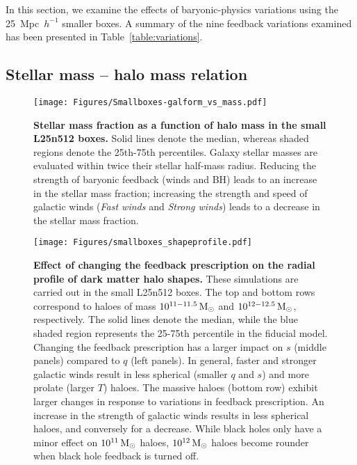 \documentclass[fleqn,usenatbib]{mnras}
\def\msun{\,\rm M_{\odot}}
\begin{document}
In this section, we examine the effects of baryonic-physics variations using the 25~Mpc~$h^{-1}$ smaller boxes. A summary of the nine feedback variations examined has been presented in Table~\ref{table:variations}.



\subsection{Stellar mass -- halo mass relation}

\begin{figure}
	\centering
	\texttt{[image: Figures/Smallboxes-galform\_vs\_mass.pdf]}
	\caption{{\bf Stellar mass fraction as a function of halo mass in the small L25n512 boxes.}
	Solid lines denote the median, whereas shaded regions denote the 25th-75th percentiles. Galaxy stellar masses are evaluated within twice their stellar half-mass radius. 
	Reducing the strength of baryonic feedback (winds and BH) leads to an increase in the stellar mass fraction; increasing the strength and speed of galactic winds (\emph{Fast winds} and \emph{Strong winds}) leads to a decrease in the stellar mass fraction.
	}
	\label{fig:smallboxes_galform}
\end{figure}

\begin{figure*}
    \centering
    \texttt{[image: Figures/smallboxes\_shapeprofile.pdf]}
    \caption{{\bf Effect of changing the feedback prescription on the radial profile of dark matter halo shapes.}
    These simulations are carried out in the small L25n512 boxes.
    The top and bottom rows correspond to haloes of mass $10^{11-11.5} \msun $ and $10^{12-12.5} \msun$, respectively. 
    The solid lines denote the median, while the blue shaded region represents the 25-75th percentile in the fiducial model.
    Changing the feedback prescription has a larger impact on $s$ (middle panels) compared to $q$ (left panels).
    In general, faster and stronger galactic winds result in less spherical (smaller $q$ and $s$) and more prolate (larger $T$) haloes.
    The massive haloes (bottom row) exhibit larger changes in response to variations in feedback prescription.
	An increase in the strength of galactic winds results in less spherical haloes, and conversely for a decrease.
	While black holes only have a minor effect on $10^{11} \msun$ haloes, $10^{12} \msun$ haloes become rounder when black hole feedback is turned off.
	}
    \label{fig:smallboxes_profile}
\end{figure*}
\end{document}
